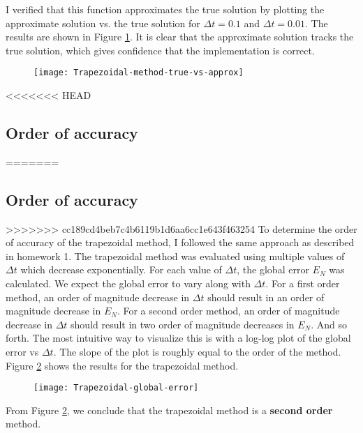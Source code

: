 \documentclass{article}
\begin{document}
I verified that this function approximates the true solution by plotting the approximate solution vs. the true solution for \(\Delta t = 0.1\) and \(\Delta t = 0.01\).  The results are shown in Figure \ref{fig:trapezoidal-approx}.  It is clear that the approximate solution tracks the true solution, which gives confidence that the implementation is correct.
\begin{figure}[H]
	\centering
	\texttt{[image: Trapezoidal-method-true-vs-approx]}
	\caption{}
	\label{fig:trapezoidal-approx}
\end{figure}
<<<<<<< HEAD
\subsection{Order of accuracy} \label{section:trapezoidal-accuracy}
=======
\subsection{Order of accuracy}
>>>>>>> cc189cd4beb7c4b6119b1d6aa6cc1e643f463254
To determine the order of accuracy of the trapezoidal method, I followed the same approach as described in homework 1. The trapezoidal method was evaluated using multiple values of $\Delta t$ which decrease exponentially.  For each value of $\Delta t$, the global error $E_N$ was calculated.  We expect the global error to vary along with $\Delta t$.  For a first order method, an order of magnitude decrease in $\Delta t$ should result in an order of magnitude decrease in $E_N$.  For a second order method, an order of magnitude decrease in $\Delta t$ should result in two order of magnitude decreases in $E_N$.  And so forth.  The most intuitive way to visualize this is with a log-log plot of the global error vs $\Delta t$.  The slope of the plot is roughly equal to the order of the method.  Figure \ref{fig:trapezoidal-global-error} shows the results for the trapezoidal method.
\begin{figure}[H]
	\centering
	\texttt{[image: Trapezoidal-global-error]}
	\caption{}
	\label{fig:trapezoidal-global-error}
\end{figure}
From Figure \ref{fig:trapezoidal-global-error}, we conclude that the trapezoidal method is a \textbf{second order} method.
\end{document}
